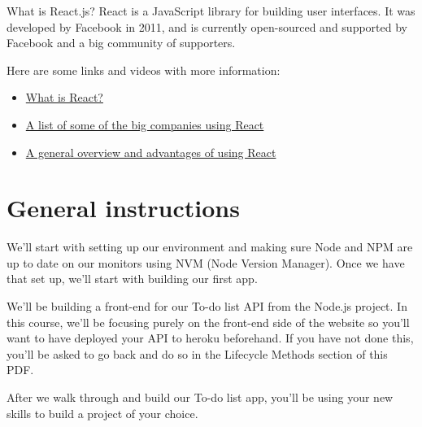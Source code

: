 \documentclass{42-en}
\begin{document}
What is React.js? React is a JavaScript library for building user interfaces. It was developed by Facebook in 2011, and is currently open-sourced and supported by Facebook and a big community of supporters.


Here are some links and videos with more information:
\begin{itemize}\itemsep1pt
\item \href{https://youtu.be/N3AkSS5hXMA}{What is React?}
\item \href{https://brainhub.eu/blog/10-famous-apps-using-reactjs-nowadays/}{A list of some of the big companies using React}
\item \href{https://medium.com/@hamzamahmood/advantages-of-developing-modern-web-apps-with-react-js-8504c571db71}{A general overview and advantages of using React}
\end{itemize}

\chapter{General instructions}

We'll start with setting up our environment and making sure Node and NPM are up to date on our monitors using NVM (Node Version Manager). Once we have that set up, we'll start with building our first app.

We'll be building a front-end for our To-do list API from the Node.js project. In this course, we'll be focusing purely on the front-end side of the website so you'll want to have deployed your API to heroku beforehand. If you have not done this, you'll be asked to go back and do so in the Lifecycle Methods section of this PDF.

After we walk through and build our To-do list app, you'll be using your new skills to build a project of your choice.

\startexercices
\end{document}
